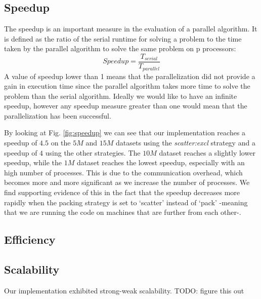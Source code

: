 \subsection{Speedup}
The speedup is an important measure in the evaluation of a parallel algorithm.
It is defined as the ratio of the serial runtime for solving a problem to the time taken by the
parallel algorithm to solve the same problem on p processors:
\begin{equation}
      Speedup = \frac{T_{serial}}{T_{parallel}}
\end{equation}
A value of speedup lower than 1 means that the parallelization did not provide a gain in execution time
since the parallel algorithm takes more time to solve the problem than the serial algorithm.
Ideally we would like to have an infinite speedup, however any speedup measure greater than one would
mean that the parallelization has been successful.

By looking at Fig. \ref{fig:speedup} we can see that our implementation reaches a speedup of $4.5$ on the
$5M$ and $15M$ datasets using the \textit{scatter:excl} strategy and a speedup of $4$ using the other strategies.
The $10M$ dataset reaches a slightly lower speedup, while the $1M$ dataset reaches the lowest speedup, especially
with an high number of processes. This is due to the communication overhead, which becomes more and more significant as we increase the number of processes. We find supporting evidence of this in the fact that the speedup decreases more rapidly when the packing strategy is set to `scatter' instead of `pack' -meaning that we are running the code on machines that are further from each other-.

\subsection{Efficiency}

\subsection{Scalability}
Our implementation exhibited {strong-weak} scalability. TODO: figure this out

